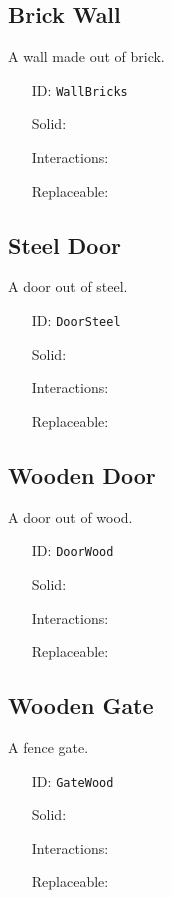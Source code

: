 \subsection{Brick Wall}\label{subsec:blocks_brick wall}
A wall made out of brick.
\newline
\begin{itemize}[nosep]
    \item[ID:] \texttt{WallBricks}
    \item[Solid:]  \Checkmark \item[Interactions:]  \XSolidBrush \item[Replaceable:]  \XSolidBrush
\end{itemize}

\subsection{Steel Door}\label{subsec:blocks_steel door}
A door out of steel.
\newline
\begin{itemize}[nosep]
    \item[ID:] \texttt{DoorSteel}
    \item[Solid:]  \Checkmark \item[Interactions:]  \Checkmark \item[Replaceable:]  \XSolidBrush
\end{itemize}

\subsection{Wooden Door}\label{subsec:blocks_wooden door}
A door out of wood.
\newline
\begin{itemize}[nosep]
    \item[ID:] \texttt{DoorWood}
    \item[Solid:]  \Checkmark \item[Interactions:]  \Checkmark \item[Replaceable:]  \XSolidBrush
\end{itemize}

\subsection{Wooden Gate}\label{subsec:blocks_wooden gate}
A fence gate.
\newline
\begin{itemize}[nosep]
    \item[ID:] \texttt{GateWood}
    \item[Solid:]  \Checkmark \item[Interactions:]  \Checkmark \item[Replaceable:]  \XSolidBrush
\end{itemize}

